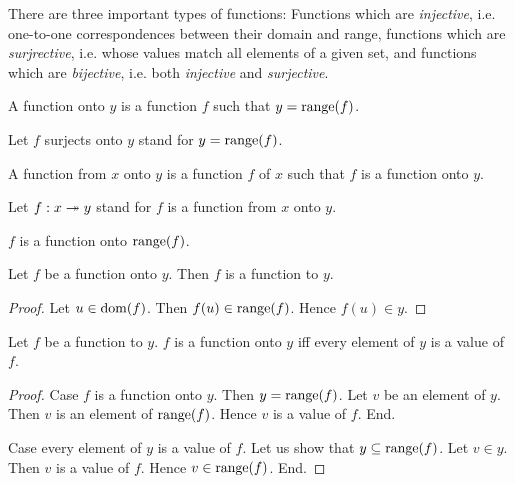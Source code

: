 \documentclass[../../set-theory.tex]{subfiles}
\begin{document}
  \noindent There are three important types of functions:
  Functions which are \textit{injective}, i.e. one-to-one correspondences
  between their domain and range, functions which are \textit{surjrective},
  i.e. whose values match all elements of a given set, and functions which are
  \textit{bijective}, i.e. both \textit{injective} and \textit{surjective}.

  \begin{forthel}
    \begin{definition}
      A function onto $y$ is a function $f$ such that $y = \operatorname{range}(f)$.
    \end{definition}

    Let $f$ surjects onto $y$ stand for $y = \operatorname{range}(f)$.

    \begin{definition}
      A function from $x$ onto $y$ is a function $f$ of $x$ such that $f$ is a function onto $y$.
    \end{definition}

    Let $f: x \twoheadrightarrow y$ stand for $f$ is a function from $x$ onto $y$.

    \begin{proposition}\label{SetTheory_02_01_677451}
      $f$ is a function onto $\operatorname{range}(f)$.
    \end{proposition}

    \begin{proposition}\label{SetTheory_02_01_495468}
      Let $f$ be a function onto $y$.
      Then $f$ is a function to $y$.
    \end{proposition}
    \begin{proof}
      Let $u \in \operatorname{dom}(f)$.
      Then $f(u) \in \operatorname{range}(f)$.
      Hence $f(u) \in y$.
    \end{proof}

    \begin{proposition}\label{SetTheory_02_01_195739}
      Let $f$ be a function to $y$.
      $f$ is a function onto $y$ iff every element of $y$ is a value of $f$.
    \end{proposition}
    \begin{proof}
      Case $f$ is a function onto $y$.
        Then $y = \operatorname{range}(f)$.
        Let $v$ be an element of $y$.
        Then $v$ is an element of $\operatorname{range}(f)$.
        Hence $v$ is a value of $f$.
      End.

      Case every element of $y$ is a value of $f$.
        Let us show that $y \subseteq \operatorname{range}(f)$.
          Let $v \in y$.
          Then $v$ is a value of $f$.
          Hence $v \in \operatorname{range}(f)$.
        End.


\end{proof}
\end{forthel}
\end{document}
